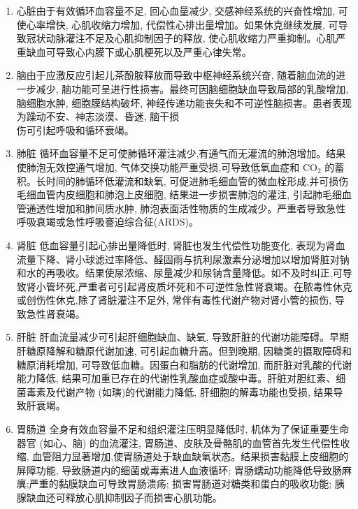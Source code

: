 \documentclass[10pt]{article}
\begin{document}
\begin{enumerate}
  \item 心脏由于有效循环血容量不足, 回心血量减少, 交感神经系统的兴奋性增加, 可使心率增快, 心肌收缩力增加, 代偿性心排出量增加。如果休克继续发展, 可导致冠状动脉灌注不足及心肌抑制因子的释放, 使心肌收缩力严重抑制。心肌严重缺血可导致心内膜下或心肌梗死以及严重心律失常。

  \item 脑由于应激反应引起儿茶酚胺释放而导致中枢神经系统兴奋, 随着脑血流的进一步减少, 脑功能可呈进行性损害。最终可因脑细胞缺血导致局部的乳酸增加, 脑细胞水肿, 细胞膜结构破坏, 神经传递功能丧失和不可逆性脑损害。患者表现为躁动不安、神志淡漠、昏迷, 脑干损\\
伤可引起呼吸和循环衰竭。

  \item 肺脏 循环血容量不足可使肺循环灌注减少,有通气而无灌流的肺泡增加。结果使肺泡无效控通气增加, 气体交换功能严重受损,可导致低氧血症和 $\mathrm{CO}_{2}$ 的蓄积。长时间的肺循环低灌流和缺氧, 可促进肺毛细血管的微血栓形成,并可损伤毛细血管内皮细胞和肺泡上皮细胞, 结果进一步损害肺泡的灌注, 引起肺毛细血管通透性增加和肺间质水肿, 肺泡表面活性物质的生成减少。严重者导致急性呼吸衰竭或急性呼吸謇迫综合征(ARDS)。

  \item 肾脏 低血容量引起心排出量降低时, 肾脏也发生代偿性功能变化, 表现为肾血流量下降、肾小球滤过率降低、醛固雨与抗利尿激素分泌增加以增加肾脏对钠和水的再吸收。结果使尿浓缩、尿量减少和尿钠含量降低。如不及时纠正,可导致肾小管坏死,严重者可引起肾皮质坏死和不可逆性急性肾衰竭。在脓毒性休克或创伤性休克,除了肾脏灌注不足外, 常伴有毒性代谢产物对肾小管的损伤, 导致急性肾衰竭。

  \item 肝脏 肝血流量减少可引起肝细胞缺血、缺氧, 导致肝脏的代谢功能障碍。早期肝糖原降解和糖原代谢加速, 可引起血糖升高。但到晚期, 因糖类的摄取障碍和糖原消耗增加, 可导致低血糖。因蛋白和脂肪的代谢增加, 而肝脏对乳酸的代谢能力降低, 结果可加重已存在的代谢性乳酸血症或酸中毒。肝脏对胆红素、细菌毒素及代谢产物 (如璌)的代谢能力降低, 肝细胞的解毒功能也受损, 结果导致肝衰竭。

  \item 胃肠道 全身有效血容量不足和组织灌注压明显降低时, 机体为了保证重要生命器官 (如心、脑) 的血流灌注, 胃肠道、皮肤及骨骼肌的血管首先发生代偿性收缩, 血管阻力显著增加,使胃肠道处于缺血缺氧状态。结果损害黏膜上皮细胞的屏障功能, 导致肠道内的细菌或毒素进人血液循环; 胃肠蠕动功能降低导致肠麻廙;严重的黏膜缺血可导致胃肠溃疡; 损害胃肠道对糖类和蛋白的吸收功能; 胰腺缺血还可释放心肌抑制因子而损害心肌功能。

\end{enumerate}
\end{document}
